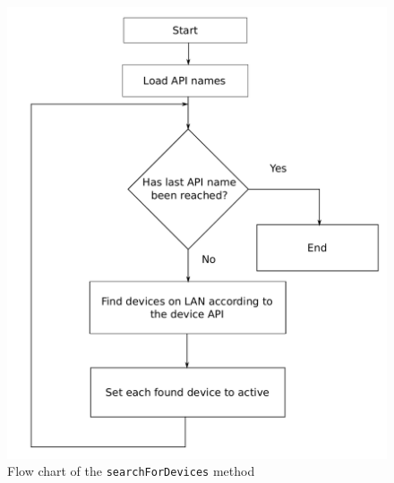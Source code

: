 \documentclass[letterpaper,12pt]{article}   %
\begin{document}
\begin{figure}[H]
    \centering
    \includegraphics[scale=0.75]{figs/searchForDevicesFlow.pdf}
    \caption{Flow chart of the \texttt{searchForDevices} method}
    \label{fig:searchfordevices}
\end{figure}
\end{document}
